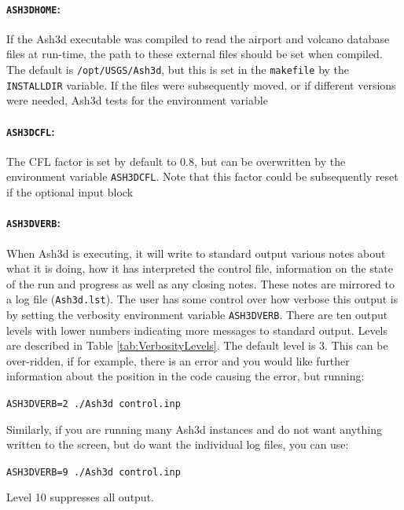 \paragraph{\texttt{ASH3DHOME}:}
If the Ash3d executable was compiled to read the
airport and volcano database files at
run-time, the path to these external files should be set when compiled. The default is
\texttt{/opt/USGS/Ash3d}, but this is set in the \texttt{makefile} by the \texttt{INSTALLDIR}
variable. If the files were subsequently moved, or if different versions were needed,
Ash3d tests for the environment variable 

\paragraph{\texttt{ASH3DCFL}:} The CFL factor
is set by default to 0.8, but can be overwritten by the environment variable \texttt{ASH3DCFL}.
Note that this factor could be subsequently reset if the optional input block

\paragraph{\texttt{ASH3DVERB}:} When Ash3d is executing, it will write to standard output
various notes about what it is doing, how it has interpreted the control file, information
on the state of the run and progress as well as any closing notes. These notes are mirrored
to a log file (\texttt{Ash3d.lst}). The user has some control over how verbose this output
is by setting the verbosity environment variable \texttt{ASH3DVERB}. There are ten output
levels with lower numbers indicating more messages to standard output. Levels are described
in Table \ref{tab:VerbosityLevels}. The default level is 3. This can be over-ridden, if
for example, there is an error and you would like further information about the position in
the code causing the error, but running:

\texttt{ASH3DVERB=2 ./Ash3d control.inp}

Similarly, if you are running many Ash3d instances and do not want anything written to the
screen, but do want the individual log files, you can use:

\texttt{ASH3DVERB=9 ./Ash3d control.inp}

Level 10 suppresses all output.

